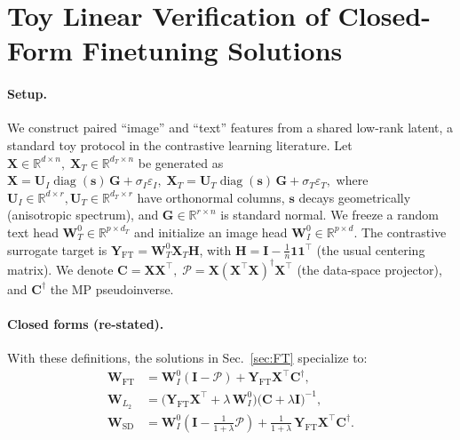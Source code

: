 \section{Toy Linear Verification of Closed-Form Finetuning Solutions}
\label{sec:toy}

\paragraph{Setup.}
We construct paired ``image'' and ``text'' features from a shared low-rank latent, a standard toy protocol in the contrastive learning literature. Let
\(
\mathbf X \in \mathbb{R}^{d \times n},\;
\mathbf X_T \in \mathbb{R}^{d_T \times n}
\)
be generated as
\(
\mathbf X = \mathbf U_I \operatorname{diag}(\mathbf s)\,\mathbf G + \sigma_I \varepsilon_I,\;
\mathbf X_T = \mathbf U_T \operatorname{diag}(\mathbf s)\,\mathbf G + \sigma_T \varepsilon_T,
\)
where \(\mathbf U_I \in \mathbb{R}^{d \times r},\mathbf U_T \in \mathbb{R}^{d_T \times r}\) have orthonormal columns, \(\mathbf s\) decays geometrically (anisotropic spectrum), and \(\mathbf G \in \mathbb{R}^{r \times n}\) is standard normal. We freeze a random text head \(\mathbf W_T^0 \in \mathbb{R}^{p \times d_T}\) and initialize an image head \(\mathbf W_I^0 \in \mathbb{R}^{p \times d}\). The contrastive surrogate target is
\(
\mathbf Y_{\mathrm{FT}} = \mathbf W_T^0 \mathbf X_T \mathbf H
\),
with \(\mathbf H = \mathbf I - \tfrac{1}{n}\mathbf 1 \mathbf 1^\top\)
(the usual centering matrix). We denote
\(
\mathbf C = \mathbf X \mathbf X^\top,\;
\mathcal P = \mathbf X(\mathbf X^\top \mathbf X)^{\dagger}\mathbf X^\top
\)
(the data-space projector), and \(\mathbf C^{\dagger}\) the MP pseudoinverse.

\paragraph{Closed forms (re-stated).}
With these definitions, the solutions in Sec.~\ref{sec:FT} specialize to:
\begin{align*}
\mathbf W_{\mathrm{FT}}
&= \mathbf W_I^0 (\mathbf I - \mathcal P) + \mathbf Y_{\mathrm{FT}}\mathbf X^\top \mathbf C^{\dagger},\\
\mathbf W_{L_2}
&= \big(\mathbf Y_{\mathrm{FT}}\mathbf X^\top + \lambda\,\mathbf W_I^0\big)\big(\mathbf C + \lambda \mathbf I\big)^{-1},\\
\mathbf W_{\mathrm{SD}}
&= \mathbf W_I^0\!\left(\mathbf I - \tfrac{1}{1+\lambda}\mathcal P\right) + \tfrac{1}{1+\lambda}\,\mathbf Y_{\mathrm{FT}}\mathbf X^\top \mathbf C^{\dagger}.
\end{align*}

